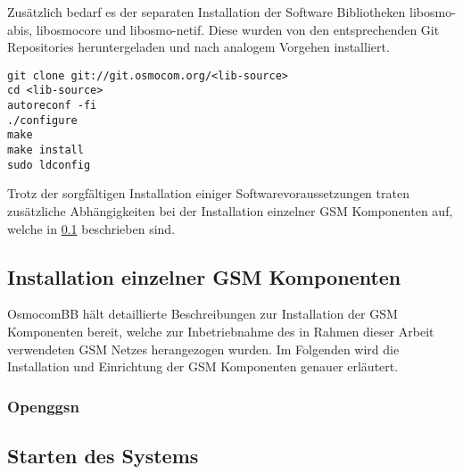 Zusätzlich bedarf es der separaten Installation der Software Bibliotheken libosmo-abis, libosmocore und libosmo-netif. Diese wurden von den entsprechenden Git Repositories heruntergeladen und nach analogem Vorgehen installiert.

\begin{lstlisting}
git clone git://git.osmocom.org/<lib-source>
cd <lib-source>
autoreconf -fi
./configure
make
make install
sudo ldconfig
\end{lstlisting}

Trotz der sorgfältigen Installation einiger Softwarevoraussetzungen traten zusätzliche Abhängigkeiten bei der Installation einzelner GSM Komponenten auf, welche in \ref{GSM_Komp} beschrieben sind.

\subsection{Installation einzelner GSM Komponenten}\label{GSM_Komp}
OsmocomBB hält detaillierte Beschreibungen zur Installation der GSM Komponenten bereit, welche zur Inbetriebnahme des in Rahmen dieser Arbeit verwendeten GSM Netzes herangezogen wurden. Im Folgenden wird die Installation und Einrichtung der GSM Komponenten genauer erläutert. 
\subsubsection{Openggsn}
\subsection{Starten des Systems}
